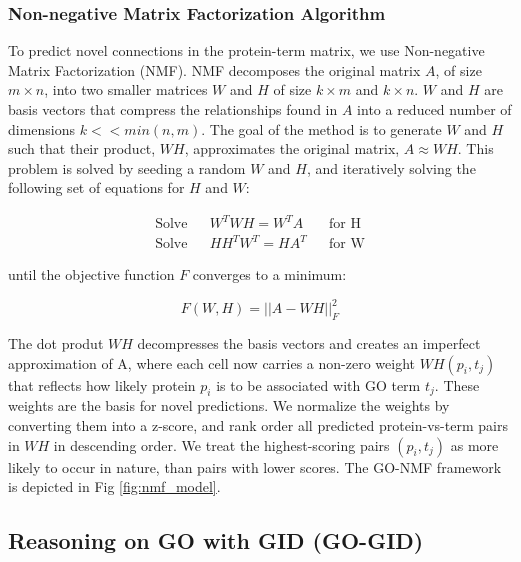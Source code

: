 \documentclass[12pt,a4paper]{report}
\begin{document}
\subsubsection{Non-negative Matrix Factorization Algorithm}
To predict novel connections in the protein-term matrix, we use Non-negative Matrix Factorization (NMF). NMF decomposes the original matrix $A$, of size $m \times n$, into two smaller matrices $W$ and $H$ of size $k \times m$ and $k \times n$. $W$ and $H$ are basis vectors that compress the relationships found in $A$ into a reduced number of dimensions $k << min(n, m)$.  The goal of the method is to generate $W$ and $H$ such that their product, $WH$, approximates the original matrix, $A \approx WH$. This problem is solved by seeding a random $W$ and $H$, and iteratively solving the following set of equations for $H$ and $W$:

\begin{equation*} \label{eq:NMF_equation}
\begin{aligned}
\text{Solve} & & W^{T}WH = W^{T}A & & \text{for H}\\
\text{Solve} & & HH^{T}W^{T} = HA^{T} & & \text{for W}
\end{aligned}
\tag{10}
\end{equation*}

until the objective function $F$ converges to a minimum:

\begin{equation*} \label{eq:NMF_equation}
F(W,H) = ||A-WH||^2_{F}
\tag{11}
\end{equation*}

The dot produt $WH$ decompresses the basis vectors and creates an imperfect approximation of A, where each cell now carries a non-zero weight $WH(p_{i},t_{j})$ that reflects how likely protein $p_{i}$ is to be associated with GO term $t_{j}$. These weights are the basis for novel predictions. We normalize the weights by converting them into a z-score, and rank order all predicted protein-vs-term pairs in $WH$ in descending order. We treat the highest-scoring pairs $(p_{i},t_{j})$ as more likely to occur in nature, than pairs with lower scores. The GO-NMF framework is depicted in Fig \ref{fig:nmf_model}.

\subsection{Reasoning on GO with GID (GO-GID)}
\end{document}
